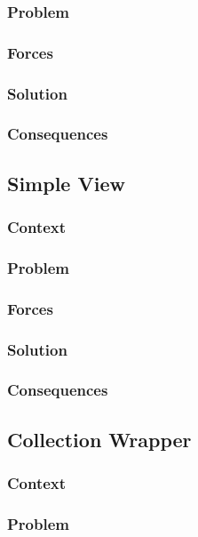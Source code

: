 \documentclass[sigconf]{acmart}
\begin{document}
\subsubsection*{Problem}
\subsubsection*{Forces}
\subsubsection*{Solution}
\subsubsection*{Consequences}


\subsection{Simple View}
\subsubsection*{Context}
\subsubsection*{Problem}
\subsubsection*{Forces}
\subsubsection*{Solution}
\subsubsection*{Consequences}


\subsection{Collection Wrapper}
\subsubsection*{Context}
\subsubsection*{Problem}
\end{document}
